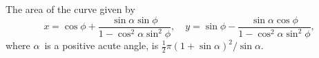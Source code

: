 The area of the curve given by
\[
x = \cos\phi + \frac{\sin\alpha \sin\phi}{1 - \cos^{2}\alpha \sin^{2}\phi},\quad
y = \sin\phi - \frac{\sin\alpha \cos\phi}{1 - \cos^{2}\alpha \sin^{2}\phi},
\]
where $\alpha$~is a positive acute angle, is $\frac{1}{2}\pi(1 + \sin\alpha)^{2}/\sin\alpha$.

